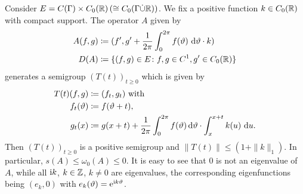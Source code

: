 \begin{example}\label{ex:b3-2.13}
	Consider $E = C(\Gamma) \times C_{0}(\mathbb{R}) \, (\cong C_{0}(\Gamma\dot{\cup}\mathbb{R}))$.
	We fix a positive function $k \in C_{0}(\mathbb{R})$ with compact support.
	The operator $A$ given by
	\begin{equation}\label{eq:b3-2.20}
		\begin{aligned}
		A(f,g) &\coloneq (f',g' + \frac{1}{2\pi}\int_{0}^{2\pi} f(\theta) \, \diff{\theta}\cdot k) \\
		D(A) &\coloneq \{(f,g) \in E \colon f,g \in C^{1}, g' \in C_{0}(\R)\}
		\end{aligned}
	\end{equation}
	generates a semigroup $(T(t))_{t \geq 0}$ which is given by
	\begin{equation}\label{eq:b3-2.21}
		\begin{aligned}
			T(t)(f,g) &\coloneq (f_{t},g_{t}) \text{ with }\\
		   f_{t}(\theta) &\coloneq f(\theta+t), \\
			g_{t}(x) &\coloneq g(x+t) + \frac{1}{2\pi}\int_{0}^{2\pi} f(\theta) \diff{\theta}\cdot\int_{x}^{x+t} k(u) \, \du .
		\end{aligned} 
	\end{equation}
	Then $(T(t))_{t \geq 0}$ is a positive semigroup and $\|T(t)\| \leq (1 + \|k\|_{1})$.
	In particular, $s(A) \leq \omega_{0}(A) \leq 0$.
	It is easy to see that $0$ is not an eigenvalue of\/ $A$, while all $\mathrm{i} k$, $k \in \mathbb{Z}$, $k \neq 0$ are eigenvalues, the corresponding eigenfunctions being $(e_{k},0)$ with $e_{k}(\theta) = \eu^{\im k\theta}$.
\end{example}
